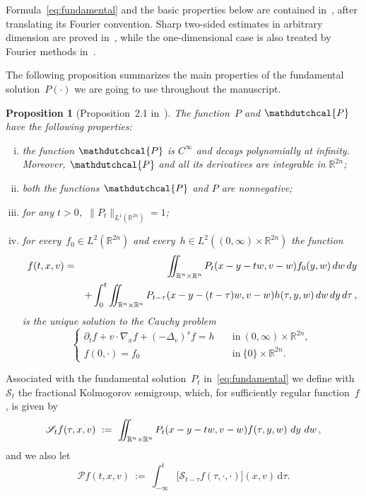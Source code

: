 \documentclass[leqno,10pt]{amsart}
\theoremstyle{plain}
\newtheorem{prop}{Proposition}[section]
\theoremstyle{remark}
\numberwithin{equation}{section}
\def\dw{\,{\rm d}w}
\def \d{\,{\rm d}}
\def\er{\mathbb{R}}
\def\ern{\mathbb{R}^n}
\begin{document}
{Formula~\eqref{eq:fundamental} and the basic properties below are contained in~\cite[Proposition~2.1]{IS20}, after translating its Fourier convention. Sharp two-sided estimates in arbitrary dimension are proved in~\cite[Theorem~1.1]{HZ24}, while the one-dimensional case is also treated by Fourier methods in~\cite{Gru24}.
    
The following proposition summarizes the main properties of the fundamental solution~$P(\cdot)$ we are going to use throughout the manuscript.
	\begin{prop}[Proposition~2.1 in~\cite{IS20}]\label{prop:fund}
    The function~$P$ and $\mathdutchcal{P}$ have the following properties:
    \begin{enumerate}[(i)]
    \item the function $\mathdutchcal{P}$ is $C^\infty$ and decays polynomially at infinity. Moreover, $\mathdutchcal{P}$ and all its derivatives are integrable in $\er^{2n}$;
    \item both the functions $\mathdutchcal{P}$ and $P$ are nonnegative;
    \item for any $t>0$,~$\|P_t\|_{L^1(\er^{2n})}=1$;
    \item for every~$f_{0} \in L^2(\er^{2n})$ and every~$h \in L^2((0,\infty)\times\er^{2n})$ the function
    \begin{eqnarray*}
    	f(t,x,v) & = & \iint_{\ern\times\ern} P_t(x-y-tw,v-w)f_{0}(y,w)\dw\d y \\
    	&& + \int_0^t \iint_{\ern\times\ern} P_{t-\tau}(x-y-(t-\tau)w,v-w)h(\tau,y,w) \dw \d y \d \tau\,,
    \end{eqnarray*}
    is the unique solution to the Cauchy problem
   $$
    \begin{cases}
     \partial_t f + v \cdot \nabla_x f + (-\Delta_v)^sf = h & \quad \text{in}~(0,\infty) \times \er^{2n},\\
     f(0,\cdot) = f_{0} & \quad \text{in}~\{0\} \times \er^{2n}.
    \end{cases}
    $$
    \end{enumerate}
	\end{prop}

    Associated with the fundamental solution~$P_t$ in~\eqref{eq:fundamental} we define with~$\mathscr{S}_t$ the fractional Kolmogorov semigroup, which, for sufficiently regular function~$f$, is given by
    \begin{equation}\label{sharp:m1:eq_semigroup}
     \mathscr{S}_t f(\tau,x,v) \ := \ \iint_{\ern\times\ern}P_t(x-y-tw,v-w)f(\tau,y,w)\,\d y\,\dw\,,
     \end{equation}
     and
      we also let
    \begin{equation}\label{sharp:m1:eq_potential}
     \mathscr{P}f(t,x,v) \ := \ \int_{-\infty}^t\big[\mathscr{S}_{t-\tau}f(\tau,\cdot,\cdot)\big](x,v)\,\mathrm d\tau.
     \end{equation}
    

}
\end{document}
